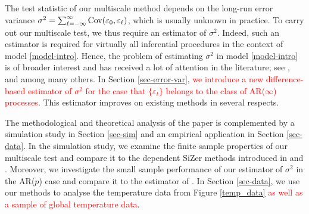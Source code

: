 The test statistic of our multiscale method depends on the long-run error variance $\sigma^2 = \sum\nolimits_{\ell=-\infty}^{\infty} \textnormal{Cov}(\varepsilon_0,\varepsilon_{\ell})$, which is usually unknown in practice. To carry out our multiscale test, we thus require an estimator of $\sigma^2$. Indeed, such an estimator is required for virtually all inferential procedures in the context of model \eqref{model-intro}. Hence, the problem of estimating $\sigma^2$ in model \eqref{model-intro} is of broader interest and has received a lot of attention in the literature; see \cite{MuellerStadtmueller1988}, \cite{Herrmann1992} and \cite{Hall2003} among many others. In Section \ref{sec-error-var}, 
\textcolor{red}{we introduce a new difference-based estimator of $\sigma^2$ for the case that $\{ \varepsilon_t \}$ belongs to the class of AR($\infty$) processes}. This estimator improves on existing methods in several respects. 


The methodological and theoretical analysis of the paper is complemented by a simulation study in Section \ref{sec-sim} and an empirical application in Section \ref{sec-data}. In the simulation study, we examine the finite sample properties of our multiscale test and compare it to the dependent SiZer methods introduced in \cite{Rondonotti2004} and \cite{Rondonotti2007}. Moreover, we investigate the small sample performance of our estimator of $\sigma^2$ in the AR($p$) case and compare it to the estimator of \cite{Hall2003}. In Section \ref{sec-data}, we use our methods to analyse the temperature data from Figure \ref{temp_data} \textcolor{red}{as well as a sample of global temperature data}. 


